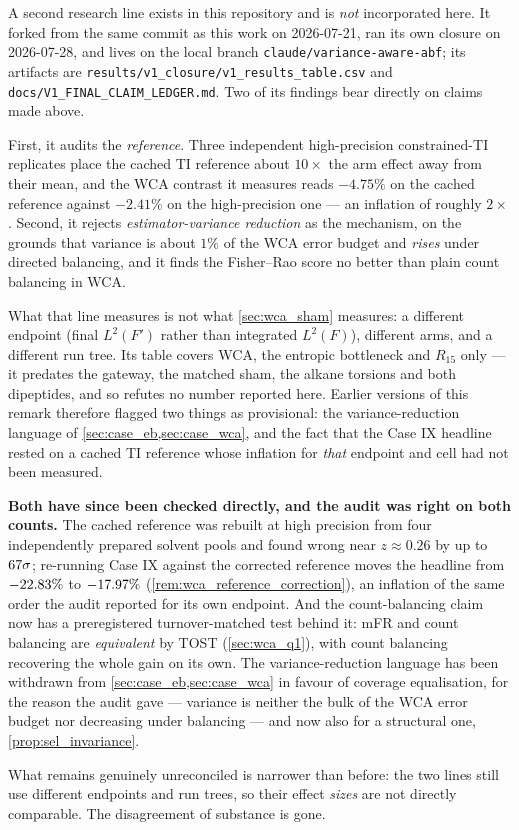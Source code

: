 \begin{remark}
\label{rem:audit_line}
A second research line exists in this repository and is \emph{not} incorporated here. It
forked from the same commit as this work on 2026-07-21, ran its own closure on 2026-07-28,
and lives on the local branch \texttt{claude/variance-aware-abf}; its artifacts are
\texttt{results/v1\_closure/v1\_results\_table.csv} and \texttt{docs/V1\_FINAL\_CLAIM\_LEDGER.md}.
Two of its findings bear directly on claims made above.

First, it audits the \emph{reference}. Three independent high-precision constrained-TI
replicates place the cached TI reference about $10\times$ the arm effect away from their
mean, and the WCA contrast it measures reads $-4.75\%$ on the cached reference against
$-2.41\%$ on the high-precision one --- an inflation of roughly $2\times$. Second, it rejects
\emph{estimator-variance reduction} as the mechanism, on the grounds that variance is about
$1\%$ of the WCA error budget and \emph{rises} under directed balancing, and it finds the
Fisher--Rao score no better than plain count balancing in WCA.

What that line measures is not what \cref{sec:wca_sham} measures: a different endpoint
(final $L^2(F')$ rather than integrated $L^2(F)$), different arms, and a different run tree.
Its table covers WCA, the entropic bottleneck and $R_{15}$ only --- it predates the gateway,
the matched sham, the alkane torsions and both dipeptides, and so refutes no number reported
here. Earlier versions of this remark therefore flagged two things as provisional: the
variance-reduction language of \cref{sec:case_eb,sec:case_wca}, and the fact that the Case IX
headline rested on a cached TI reference whose inflation for \emph{that} endpoint and cell
had not been measured.

\textbf{Both have since been checked directly, and the audit was right on both counts.} The
cached reference was rebuilt at high precision from four independently prepared solvent
pools and found wrong near $z\approx0.26$ by up to $67\sigma$; re-running Case IX
against the corrected reference moves the headline from $-22.83\%$ to $-17.97\%$
(\cref{rem:wca_reference_correction}), an inflation of the same order the audit reported for
its own endpoint. And the count-balancing claim now has a preregistered turnover-matched test
behind it: mFR and count balancing are \emph{equivalent} by TOST
(\cref{sec:wca_q1}), with count balancing recovering the whole gain on its own. The
variance-reduction language has been withdrawn from \cref{sec:case_eb,sec:case_wca} in favour
of coverage equalisation, for the reason the audit gave --- variance is neither the bulk of
the WCA error budget nor decreasing under balancing --- and now also for a structural one,
\cref{prop:sel_invariance}.

What remains genuinely unreconciled is narrower than before: the two lines still use
different endpoints and run trees, so their effect \emph{sizes} are not directly comparable.
The disagreement of substance is gone.
\end{remark}

